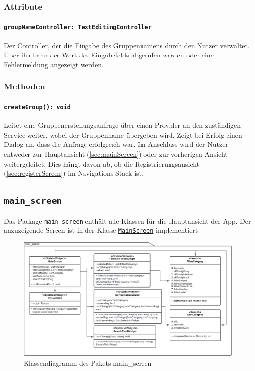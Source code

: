 \documentclass{entwurfsheft}
\begin{document}
\begin{sloppypar}
\subsubsection*{Attribute}
\paragraph{\texttt{groupNameController: TextEditingController}}
Der Controller, der die Eingabe des Gruppennamens durch den Nutzer verwaltet. Über ihn kann der Wert des Eingabefelds abgerufen werden oder eine Fehlermeldung angezeigt werden.
\subsubsection*{Methoden}
\paragraph{\texttt{createGroup(): void}}
Leitet eine Gruppenerstellungsanfrage über einen Provider an den zuständigen Service weiter, wobei der Gruppenname übergeben wird. Zeigt bei Erfolg einen \Gls{Dialog} an, dass die Anfrage erfolgreich war. Im Anschluss wird der Nutzer entweder zur Hauptansicht (\ref{sec:mainScreen}) oder zur vorherigen Ansicht weitergeleitet. Dies hängt davon ab, ob die Registrierungsansicht (\ref{sec:registerScreen}) im Navigations-Stack ist.
\newpage

\subsection{\texttt{main\_screen}}
Das Package \texttt{main\_screen} enthält alle Klassen für die Hauptansicht der App. Der anzuzeigende Screen ist in der Klasse \hyperref[sec:mainScreen]{\texttt{MainScreen}} implementiert
\begin{figure}
    [htp]
    \centering
    \includegraphics[width=\textwidth]{images/presentationLayer/classDiagrams/mainScreenWhole.pdf}
    \caption{Klassendiagramm des Pakets main\_screen}
\end{figure}
\newpage

\end{sloppypar}
\end{document}
